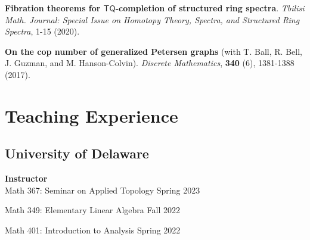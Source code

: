 \documentclass[10pt,letterpaper]{article}
\renewenvironment{itemize}{
  \begin{list}{}{
    \setlength{\leftmargin}{1.5em}
    \setlength{\itemsep}{0.25em}
    \setlength{\parskip}{0pt}
    \setlength{\parsep}{0.25em}
  }
}{
  \end{list}
}
\begin{document}
\begin{itemize}


\item {\bf Fibration theorems for $\mathsf{TQ}$-completion of structured ring spectra}. \textit{Tbilisi Math. Journal: Special Issue on Homotopy Theory, Spectra, and Structured Ring Spectra}, 1-15 (2020). 


\item {\bf On the cop number of generalized Petersen graphs} (with T. Ball, R. Bell, J. Guzman, and M. Hanson-Colvin). \textit{Discrete Mathematics}, \textbf{340} (6), 1381-1388 (2017). 









\end{itemize}




\section*{Teaching Experience}

\subsection*{University of Delaware}
\begin{itemize}
\item {\bf {\fontsize{11}{11}\selectfont Instructor}}\\
{Math 367: Seminar on Applied Topology \hfill Spring 2023}

{Math 349: Elementary Linear Algebra \hfill Fall 2022}

{Math 401: Introduction to Analysis} \hfill Spring 2022
\end{itemize}
\end{document}
